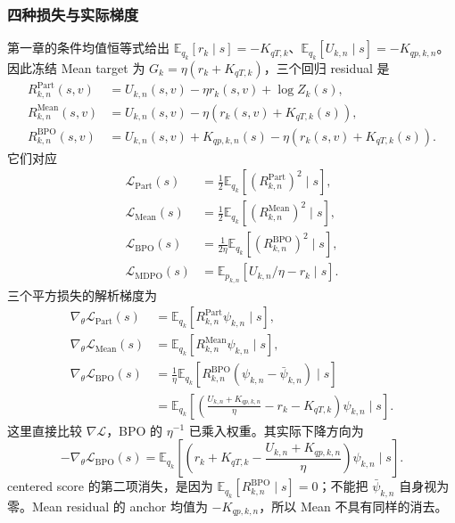 \subsubsection*{四种损失与实际梯度}
第一章的条件均值恒等式给出 $\mathbb E_{q_k}[r_k\mid s]=-K_{qT,k}$、$\mathbb E_{q_k}[U_{k,n}\mid s]=-K_{qp,k,n}$。因此冻结 Mean target 为 $G_k=\eta(r_k+K_{qT,k})$，三个回归 residual 是
\begin{align}
R_{k,n}^{\mathrm{Part}}(s,v)&=U_{k,n}(s,v)-\eta r_k(s,v)+\log Z_k(s),
\label{eq:ch2-opd-full-part-simplified}\\
R_{k,n}^{\mathrm{Mean}}(s,v)&=U_{k,n}(s,v)-\eta(r_k(s,v)+K_{qT,k}(s)),
\label{eq:ch2-opd-full-mean-simplified}\\
R_{k,n}^{\mathrm{BPO}}(s,v)&=U_{k,n}(s,v)+K_{qp,k,n}(s)-\eta(r_k(s,v)+K_{qT,k}(s)).
\label{eq:ch2-opd-full-bpo-residual}
\end{align}
它们对应
\begin{align}
\mathcal L_{\mathrm{Part}}(s)&=\tfrac12\mathbb E_{q_k}[(R_{k,n}^{\mathrm{Part}})^2\mid s],\\
\mathcal L_{\mathrm{Mean}}(s)&=\tfrac12\mathbb E_{q_k}[(R_{k,n}^{\mathrm{Mean}})^2\mid s],\\
\mathcal L_{\mathrm{BPO}}(s)&=\tfrac1{2\eta}\mathbb E_{q_k}[(R_{k,n}^{\mathrm{BPO}})^2\mid s],
\label{eq:ch2-opd-full-bpo-simplified}\\
\mathcal L_{\mathrm{MDPO}}(s)&=\mathbb E_{p_{k,n}}[U_{k,n}/\eta-r_k\mid s].
\label{eq:ch2-opd-full-mdpo-simplified}
\end{align}
三个平方损失的解析梯度为
\begin{align}
\nabla_\theta\mathcal L_{\mathrm{Part}}(s)&=\mathbb E_{q_k}[R_{k,n}^{\mathrm{Part}}\psi_{k,n}\mid s],\\
\nabla_\theta\mathcal L_{\mathrm{Mean}}(s)&=\mathbb E_{q_k}[R_{k,n}^{\mathrm{Mean}}\psi_{k,n}\mid s],\\
\nabla_\theta\mathcal L_{\mathrm{BPO}}(s)&=\frac1\eta\mathbb E_{q_k}[R_{k,n}^{\mathrm{BPO}}(\psi_{k,n}-\bar\psi_{k,n})\mid s]\\
&=\mathbb E_{q_k}\left[\left(\frac{U_{k,n}+K_{qp,k,n}}\eta-r_k-K_{qT,k}\right)\psi_{k,n}\mid s\right].
\label{eq:ch2-opd-full-bpo-gradient-simplified}
\end{align}
这里直接比较 $\nabla\mathcal L$，BPO 的 $\eta^{-1}$ 已乘入权重。其实际下降方向为
\begin{equation}
-\nabla_\theta\mathcal L_{\mathrm{BPO}}(s)
=\mathbb E_{q_k}\left[\left(r_k+K_{qT,k}-\frac{U_{k,n}+K_{qp,k,n}}\eta\right)\psi_{k,n}\mid s\right].
\label{eq:ch2-opd-bpo-descent-expanded}
\end{equation}
centered score 的第二项消失，是因为 $\mathbb E_{q_k}[R_{k,n}^{\mathrm{BPO}}\mid s]=0$；不能把 $\bar\psi_{k,n}$ 自身视为零。Mean residual 的 anchor 均值为 $-K_{qp,k,n}$，所以 Mean 不具有同样的消去。

